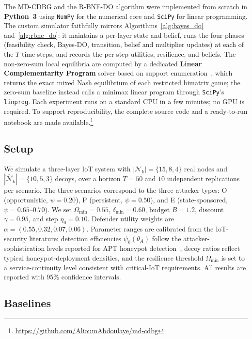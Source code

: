 \documentclass[conference]{IEEEtran}
\begin{document}
The MD-CDBG and the R-BNE-DO algorithm were implemented from scratch in
\textbf{Python~3} using \texttt{NumPy} for the numerical core and \texttt{SciPy}
for linear programming. The custom simulator faithfully mirrors
Algorithms~\ref{alg:bayes_do} and~\ref{alg:rbne_do}: it maintains a per-layer
state and belief, runs the four phases (feasibility check, Bayes-DO,
transition, belief and multiplier updates) at each of the $T$ time steps, and
records the per-step utilities, resilience, and beliefs. The non-zero-sum local
equilibria are computed by a dedicated \textbf{Linear Complementarity Program}
solver based on support enumeration~\cite{porter2008}, which returns the exact
mixed Nash equilibrium of each restricted bimatrix game; the zero-sum baseline
instead calls a minimax linear program through \texttt{SciPy}'s
\texttt{linprog}. Each experiment runs on a standard CPU in a few minutes; no
GPU is required. To support reproducibility, the complete source code and a
ready-to-run notebook are made available.\footnote{\url{https://github.com/AlioumAbdoulaye/md-cdbg}}

\subsection{Setup}

We simulate a three-layer IoT system with $|\mathcal{N}_k|=\{15,8,4\}$ real
nodes and $|\hat{\mathcal{N}}_k|=\{10,5,3\}$ decoys, over a horizon $T=50$ and
$10$ independent replications per scenario. The three scenarios correspond to
the three attacker types: O (opportunistic, $\psi=0.20$), P (persistent,
$\psi=0.50$), and E (state-sponsored, $\psi=0.65$--$0.70$). We set
$\Omega_{\min}=0.55$, $\delta_{\min}=0.60$, budget $B=1.2$, discount
$\gamma=0.95$, and step $\eta_0=0.10$. Defender utility weights are
$\alpha=(0.55,0.32,0.07,0.06)$. Parameter ranges are calibrated from the
IoT-security literature: detection efficiencies $\psi_k(\theta_A)$ follow the
attacker-sophistication levels reported for APT honeypot
detection~\cite{wan2022}, decoy ratios reflect typical honeypot-deployment
densities, and the resilience threshold $\Omega_{\min}$ is set to a
service-continuity level consistent with critical-IoT requirements. All results
are reported with 95\% confidence intervals.

\subsection{Baselines}
\end{document}

